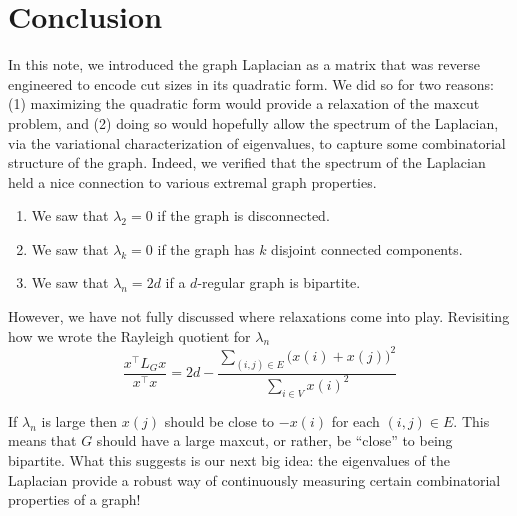 \section{Conclusion}

In this note, we introduced the graph Laplacian as a matrix that was reverse engineered to encode cut sizes in its quadratic form. We did so for two reasons: (1) maximizing the quadratic form would provide a relaxation of the maxcut problem, and (2) doing so would hopefully allow the spectrum of the Laplacian, via the variational characterization of eigenvalues, to capture some combinatorial structure of the graph. Indeed, we verified that the spectrum of the Laplacian held a nice connection to various extremal graph properties.
\vspace{-1em}
\begin{enumerate}[-]
  \item We saw that $\lambda_2 = 0$ if the graph is disconnected.

  \item We saw that $\lambda_k = 0$ if the graph has $k$ disjoint connected components.

  \item We saw that $\lambda_n = 2d$ if a $d$-regular graph is bipartite.
\end{enumerate}

However, we have not fully discussed where relaxations come into play. Revisiting how we wrote the Rayleigh quotient for $\lambda_n$
\begin{equation*}
\frac{x^\top L_G x}{x^\top x}
= 2d - \frac{\sum_{(i, j) \in E} \big( x(i) + x(j) \big)^2 }{\sum_{i \in V} x(i)^2}
\end{equation*}

If $\lambda_n$ is large then $x(j)$ should be close to $-x(i)$ for each $(i, j) \in E$. This means that $G$ should have a large maxcut, or rather, be ``close'' to being bipartite. What this suggests is our next big idea: the eigenvalues of the Laplacian provide a robust way of continuously measuring certain combinatorial properties of a graph!
